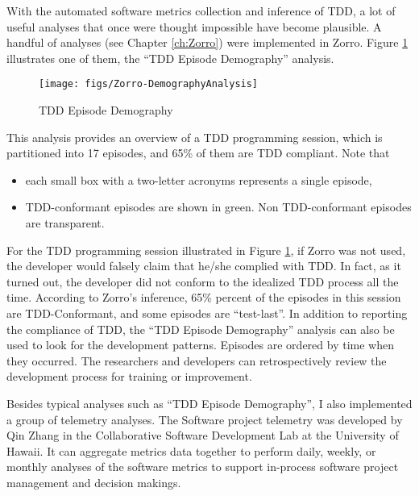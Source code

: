 With the automated software metrics collection and inference of TDD, a lot of useful analyses that once were thought impossible have become plausible. A handful of analyses (see Chapter \ref{ch:Zorro}) were implemented in Zorro. Figure \ref{fig:Zorro-Demography} illustrates one of them, the ``TDD Episode Demography'' analysis. 
\begin{figure}[htbp]
  \centering
  \texttt{[image: figs/Zorro-DemographyAnalysis]}
  \caption{TDD Episode Demography}
  \label{fig:Zorro-Demography}
\end{figure}
This analysis provides an overview of a TDD programming session, which is partitioned into 17 episodes, and 65\% of them are TDD compliant. Note that 
\begin{itemize}
\item each small box with a two-letter acronyms represents a single episode,
\item TDD-conformant episodes are shown in green. Non TDD-conformant episodes are transparent. 
\end{itemize}
For the TDD programming session illustrated in Figure \ref{fig:Zorro-Demography}, if Zorro was not used, the developer would falsely claim that he/she complied with TDD. In fact, as it turned out, the developer did not conform to the idealized TDD process all the time. According to Zorro's inference, 65\% percent of the episodes in this session are TDD-Conformant, and some episodes are ``test-last''. In addition to reporting the compliance of TDD, the ``TDD Episode Demography'' analysis can also be used to look for the development patterns. Episodes are ordered by time when they occurred. The researchers and developers can retrospectively review the development process for training or improvement. 

Besides typical analyses such as ``TDD Episode Demography'', I also implemented a group of telemetry analyses. The Software project telemetry \cite{csdl2-04-11,csdl2-06-05} was developed by Qin Zhang in the Collaborative Software Development Lab at the University of Hawaii. It can aggregate metrics data together to perform daily, weekly, or monthly analyses of the software metrics to support in-process software project management and decision makings. 
 
